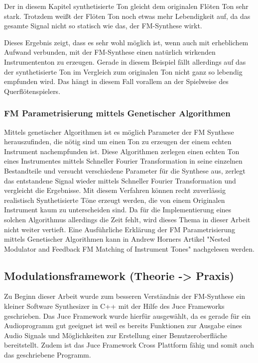Der in diesem Kapitel synthetisierte Ton gleicht dem originalen Flöten Ton sehr stark. Trotzdem weißt der Flöten Ton noch etwas mehr Lebendigkeit auf, da das gesamte Signal nicht so statisch wie das, der FM-Synthese wirkt. 

Dieses Ergebnis zeigt, dass es sehr wohl möglich ist, wenn auch mit erheblichem Aufwand verbunden, mit der FM-Synthese einen natürlich wirkenden Instrumententon zu erzeugen. Gerade in diesem Beispiel fällt allerdings auf das der synthetisierte Ton im Vergleich zum originalen Ton nicht ganz so lebendig empfunden wird. Das hängt in diesem Fall vorallem an der Spielweise des Querflötenspielers.


\FloatBarrier
\subsubsection{FM Parametrisierung mittels Genetischer Algorithmen}

Mittels genetischer Algorithmen ist es möglich Parameter der FM Synthese herauszufinden, die nötig sind um einen Ton zu erzeugen der einem echten Instrument nachempfunden ist. Diese Algorithmen zerlegen einen echten Ton eines Instrumentes mittels Schneller Fourier Transformation in seine einzelnen Bestandteile und versucht verschiedene Parameter für die Synthese aus, zerlegt das entstandene Signal wieder mittels Schneller Fourier Transformation und vergleicht die Ergebnisse. Mit diesem Verfahren können recht zuverlässig realistisch Synthetisierte Töne erzeugt werden, die von einem Originalen Instrument kaum zu unterscheiden sind. Da für die Implementierung eines solchen Algorithmus allerdings die Zeit fehlt, wird dieses Thema in dieser Arbeit nicht weiter vertieft. Eine Ausführliche Erklärung der FM Parametrisierung mittels Genetischer Algorithmen kann in Andrew Horners Artikel "Nested Modulator and Feedback FM Matching of Instrument Tones" nachgelesen werden.

\FloatBarrier
\subsection{Modulationsframework (Theorie -> Praxis)}

Zu Beginn dieser Arbeit wurde zum besseren Verständnis der FM-Synthese ein kleiner Software Synthesizer in C++ mit der Hilfe des Juce Frameworks geschrieben. Das Juce Framework wurde hierfür ausgewählt, da es gerade für ein Audioprogramm gut geeignet ist weil es bereits Funktionen zur Ausgabe eines Audio Signals und Möglichkeiten zur Erstellung einer Benutzeroberfläche bereitstellt. Zudem ist das Juce Framework Cross Plattform fähig und somit auch das geschriebene Programm. 

